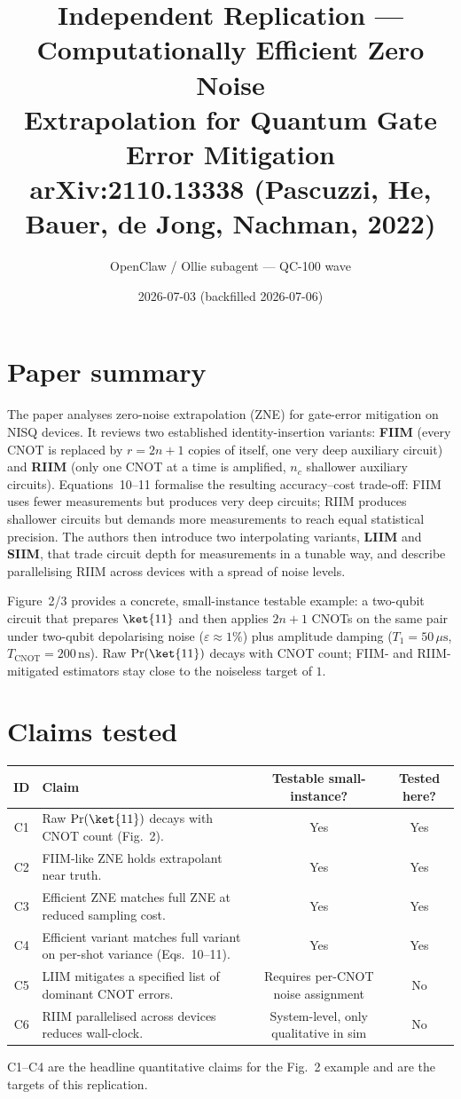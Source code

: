 \documentclass[11pt]{article}
\title{Independent Replication --- Computationally Efficient Zero Noise\\
Extrapolation for Quantum Gate Error Mitigation\\
\large arXiv:2110.13338 (Pascuzzi, He, Bauer, de Jong, Nachman, 2022)}
\author{OpenClaw / Ollie subagent --- QC-100 wave}
\date{2026-07-03 (backfilled 2026-07-06)}
\begin{document}
\maketitle

\section{Paper summary}
The paper analyses zero-noise extrapolation (ZNE) for gate-error mitigation on NISQ
devices. It reviews two established identity-insertion variants: \textbf{FIIM}
(every CNOT is replaced by $r=2n+1$ copies of itself, one very deep auxiliary
circuit) and \textbf{RIIM} (only one CNOT at a time is amplified, $n_c$ shallower
auxiliary circuits). Equations~10--11 formalise the resulting accuracy--cost
trade-off: FIIM uses fewer measurements but produces very deep circuits; RIIM
produces shallower circuits but demands more measurements to reach equal
statistical precision. The authors then introduce two interpolating variants,
\textbf{LIIM} and \textbf{SIIM}, that trade circuit depth for measurements in a
tunable way, and describe parallelising RIIM across devices with a spread of
noise levels.

Figure~2/3 provides a concrete, small-instance testable example: a two-qubit
circuit that prepares $\ket{11}$ and then applies $2n+1$ CNOTs on the same pair
under two-qubit depolarising noise ($\varepsilon \approx 1\%$) plus amplitude
damping ($T_1 = 50\,\mu\mathrm{s}$, $T_{\mathrm{CNOT}} = 200\,\mathrm{ns}$).
Raw $\Pr(\ket{11})$ decays with CNOT count; FIIM- and RIIM-mitigated estimators
stay close to the noiseless target of $1$.

\section{Claims tested}
\begin{center}
\begin{tabular}{clcc}
\toprule
ID & Claim & Testable small-instance? & Tested here? \\
\midrule
C1 & Raw $\Pr(\ket{11})$ decays with CNOT count (Fig.~2). & Yes & Yes \\
C2 & FIIM-like ZNE holds extrapolant near truth. & Yes & Yes \\
C3 & Efficient ZNE matches full ZNE at reduced sampling cost. & Yes & Yes \\
C4 & Efficient variant matches full variant on per-shot variance (Eqs.~10--11). & Yes & Yes \\
C5 & LIIM mitigates a specified list of dominant CNOT errors. & Requires per-CNOT noise assignment & No \\
C6 & RIIM parallelised across devices reduces wall-clock. & System-level, only qualitative in sim & No \\
\bottomrule
\end{tabular}
\end{center}
C1--C4 are the headline quantitative claims for the Fig.~2 example and are the
targets of this replication.
\end{document}
